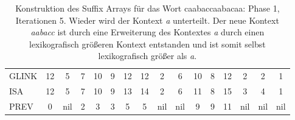 \begin{table}[H]
\begin{adjustbox}{max width=\textwidth}
\begin{tabular}{lccccccccccccccc}
\multicolumn{1}{l|}{GLINK}   & 12                      & \cellcolor[HTML]{\red}5 & 7                         & 10                      & 9                                                   & 12                        & 12                         & 2                         & 6                        & 10 & 8                       & 12 & 2                         & 2                         & 1   \\
\multicolumn{1}{l|}{ISA}     & 12                      & \cellcolor[HTML]{\red}5 & 7                         & 10                      & 9                                                   & 13                        & 14                         & \cellcolor[HTML]{\red}2 & 6                        & 11 & 8                       & 15 & \cellcolor[HTML]{\red}3 & \cellcolor[HTML]{\red}4 & 1   \\
\multicolumn{1}{l|}{PREV}    & 0                       & nil                       & \cellcolor[HTML]{\red}2 & 3                       & 3                                                   & 5                         & 5                          & nil                       & nil                      & 9  & 9                       & 11 & nil                       & nil                       & nil
\end{tabular}
\end{adjustbox}

\caption[Konstruktion des Suffix Arrays für das Wort caabaccaabacaa: Phase 1, Iterationen 5]{Konstruktion des Suffix Arrays für das Wort caabaccaabacaa: Phase 1, Iterationen 5. Wieder wird der Kontext \textit{a} unterteilt. Der neue Kontext \textit{aabacc} ist durch eine Erweiterung des Kontextes \textit{a} durch einen lexikografisch größeren Kontext entstanden und ist somit selbst lexikografisch größer als \textit{a}.}
\label{table_complex_example_1_5} 
\end{table}

